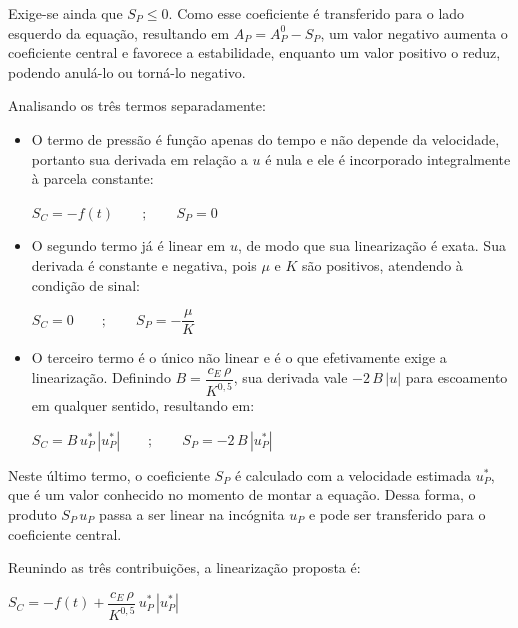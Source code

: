 Exige-se ainda que $S_{P} \le 0$. Como esse coeficiente é transferido para o lado esquerdo da equação, resultando em $A_{P} = A_{P}^{0} - S_{P}$, um valor negativo aumenta o coeficiente central e favorece a estabilidade, enquanto um valor positivo o reduz, podendo anulá-lo ou torná-lo negativo.

Analisando os três termos separadamente:

\vspace{0.5cm}
\begin{itemize}
    \item [1 - ]O termo de pressão é função apenas do tempo e não depende da velocidade, portanto sua derivada em relação a $u$ é nula e ele é incorporado integralmente à parcela constante:
    \begin{center}
        $S_{C} = -f(t) \qquad ; \qquad S_{P} = 0$
    \end{center}
    \vspace{0.5cm}
    \item [2 - ]O segundo termo já é linear em $u$, de modo que sua linearização é exata. Sua derivada é constante e negativa, pois $\mu$ e $K$ são positivos, atendendo à condição de sinal:
    \begin{center}
        $S_{C} = 0 \qquad ; \qquad S_{P} = -\dfrac{\mu}{K}$
    \end{center}
    \vspace{0.5cm}
    \item [3 - ]O terceiro termo é o único não linear e é o que efetivamente exige a linearização. Definindo $B = \dfrac{c_{E}\,\rho}{K^{0,5}}$, sua derivada vale $-2\,B\,|u|$ para escoamento em qualquer sentido, resultando em:
    \begin{center}
        $S_{C} = B\,u_{P}^{*}\,\left|u_{P}^{*}\right| \qquad ; \qquad S_{P} = -2\,B\,\left|u_{P}^{*}\right|$
    \end{center}
\end{itemize}
\vspace{0.5cm}

Neste último termo, o coeficiente $S_{P}$ é calculado com a velocidade estimada $u_{P}^{*}$, que é um valor conhecido no momento de montar a equação. Dessa forma, o produto $S_{P}\,u_{P}$ passa a ser linear na incógnita $u_{P}$ e pode ser transferido para o coeficiente central.

Reunindo as três contribuições, a linearização proposta é:

\begin{center}
    $S_{C} = -f(t) + \dfrac{c_{E}\,\rho}{K^{0,5}}\,u_{P}^{*}\,\left|u_{P}^{*}\right|$
\end{center}

